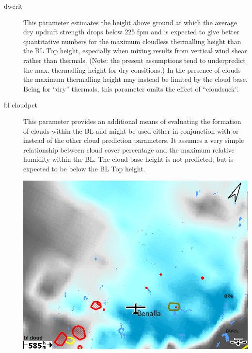 \documentclass[a4paper,12pt]{refrep}
\begin{document}
\begin{description}
\item[dwcrit]  
This parameter estimates the height above ground at which the average
dry updraft strength drops below 225 fpm and is expected to give
better quantitative numbers for the maximum cloudless thermalling
height than the BL Top height, especially when mixing results from
vertical wind shear rather than thermals.  (Note: the present
assumptions tend to underpredict the max. thermalling height for dry
consitions.) In the presence of clouds the maximum thermalling height
may instead be limited by the cloud base.  Being for ``dry'' thermals,
this parameter omits the effect of ``cloudsuck''.

\item[bl cloudpct]  
This parameter provides an additional means of evaluating the
formation of clouds within the BL and might be used either in
conjunction with or instead of the other cloud prediction parameters.
It assumes a very simple relationship between cloud cover percentage
and the maximum relative humidity within the BL.  The cloud base
height is not predicted, but is expected to be below the BL Top
height.

\begin{center}
\includegraphics[angle=0,width=\linewidth,keepaspectratio='true']{figures/rasp-blcloudpct.png}
\end{center}


\end{description}
\end{document}
